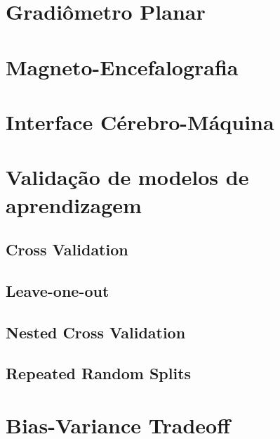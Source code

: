\section{Gradiômetro Planar}
\section{Magneto-Encefalografia}
\section{Interface Cérebro-Máquina}
\section{Validação de modelos de aprendizagem}
\subsection{Cross Validation}
\subsection{Leave-one-out}
\subsection{Nested Cross Validation}
\subsection{Repeated Random Splits}
\section{Bias-Variance Tradeoff}



















